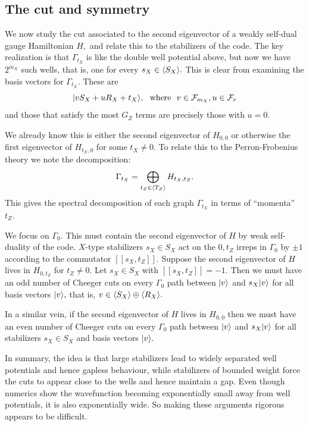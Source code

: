 \subsection{The cut and symmetry}

We now study 
the cut associated to the second eigenvector of a 
weakly self-dual gauge Hamiltonian $H,$
and relate this to the stabilizers of the code.
The key realization is that $\Gamma_{t_X}$ is like
the double well potential above,
but now we have $2^{m_X}$ such wells,
that is, one for every $s_X\in \langle S_X \rangle.$
This is clear from examining the basis vectors for $\Gamma_{t_X}.$
These are 
$$
    |{v S_X + u R_X + t_X}\rangle, \ \ \mbox{where}\ \  v\in \mathcal{F}_{m_X}, u\in\mathcal{F}_{r}
$$
and those that satisfy the most $G_Z$ terms are
precisely those with $u=0.$

We already know this is either the second eigenvector of $H_{0,0}$
or otherwise the first eigenvector of $H_{t_X,0}$ for some $t_X \ne 0.$
To relate this to the Perron-Frobenius theory we note the 
decomposition:
$$
    \Gamma_{t_X} = \bigoplus_{t_Z\in\langle T_Z \rangle} H_{t_X, t_Z}.
$$
This gives the spectral decomposition of each graph $\Gamma_{t_X}$ 
in terms of ``momenta'' $t_Z.$

We focus on $\Gamma_0.$
This must contain the second eigenvector of $H$ by weak self-duality of the code.
$X$-type stabilizers $s_X\in S_X$ act on the $0,t_Z$ irreps in $\Gamma_0$
by $\pm 1$ according to the commutator $[[s_X, t_Z]].$
Suppose the second eigenvector of $H$ lives in
$H_{0,t_Z}$ for $t_Z\ne 0$. 
Let $s_X\in S_X$ with $[[s_X, t_Z]]=-1.$
Then we must have an odd number of Cheeger cuts 
on every $\Gamma_0$ path between $|{v}\rangle$ and $s_X|{v}\rangle$ for all basis
vectors $|{v}\rangle,$ that is, $v\in\langle S_X \rangle\oplus\langle R_X \rangle.$

In a similar vein, if the second eigenvector of $H$ lives in $H_{0,0}$
then we must have an even number of Cheeger cuts 
on every $\Gamma_0$ path between $|{v}\rangle$ and $s_X|{v}\rangle$ for all stabilizers $s_X\in S_X$
and basis vectors $|{v}\rangle.$

In summary, the idea is that large stabilizers lead to
widely separated well potentials and hence gapless behaviour,
while stabilizers of bounded weight force the cuts to
appear close to the wells and hence maintain a gap.
Even though numerics show the wavefunction becoming 
exponentially small away from well potentials,
it is also exponentially wide.
So making these arguments rigorous appears to be difficult.

